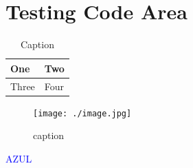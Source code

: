 \chapter{Testing Code Area}
\begin{table}[H]
	\caption{Caption}
	\label{Label}
	\begin{center}
		\begin{tabular}{||l|l||}\hline
			One & Two \\\hline
			Three & Four \\\hline
		\end{tabular}
	\end{center}
\end{table}
\vspace{1cm}
\begin{figure}[H]
	 \flushleft
	 \texttt{[image: ./image.jpg]}
	 \caption{caption}
	 \label{label}
\end{figure}
\textcolor{blue}{AZUL}
